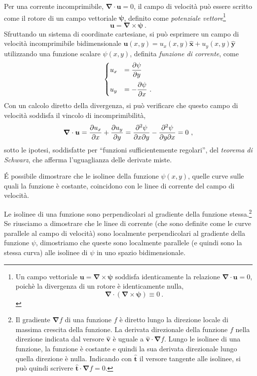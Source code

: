 
Per una corrente incomprimibile, $\bm{\nabla} \cdot \bm{u} = 0$, il campo di velocità può essere scritto come il rotore di un campo vettoriale $\bm{\psi}$, definito come \textit{potenziale vettore}\footnote{Un campo vettoriale $\bm{u} = \bm{\nabla} \times \bm{\psi}$ soddisfa identicamente la relazione $\bm{\nabla} \cdot \bm{u} = 0$, poichè la divergenza di un rotore è identicamente nulla,
\begin{equation}
  \bm{\nabla} \cdot \left( \bm{\nabla} \times \bm{\psi} \right) \equiv 0 \ .
\end{equation} }
\begin{equation}\label{eqn:psi}
 \bm{u} = \bm{\nabla} \times \bm{\psi} \ .
\end{equation}
Sfruttando un sistema di coordinate cartesiane, si può esprimere un campo di velocità incomprimibile bidimensionale $\bm{u}(x,y) = u_x(x,y) \bm{\hat{x}} + u_y(x,y) \bm{\hat{y}}$ utilizzando una funzione scalare $\psi(x,y)$, definita \textit{funzione di corrente}, come
\begin{equation}
\begin{cases}
 u_x & = \p{\psi}{y} \vspace{0.2cm} \\
 u_y & =-\p{\psi}{x} \ . \\
\end{cases}
\end{equation}
Con un calcolo diretto della divergenza, si può verificare che questo campo di velocità soddisfa il vincolo di incomprimibilità,
\begin{equation}
 \bm{\nabla} \cdot \bm{u} = \dfrac{\partial{u_x}}{\partial{x}} + \dfrac{\partial{u_y}}{\partial{y}} =
  \frac{\partial^2 \psi}{\partial x \partial y} - 
  \frac{\partial^2 \psi}{\partial y \partial x} = 0 \ ,
\end{equation}
sotto le ipotesi, soddisfatte per ``funzioni sufficientemente regolari'', del \textit{teorema di Schwarz}, che afferma l'uguaglianza delle derivate miste.

\vspace{0.2cm}
\'E possibile dimostrare che le isolinee della funzione $\psi(x,y)$, quelle curve sulle quali la funzione è costante, coincidono con le linee di corrente del campo di velocità.

\noindent
Le isolinee di una funzione sono perpendicolari al gradiente della funzione stessa.\footnote{
 Il gradiente $\bm{\nabla} f$ di una funzione $f$ è diretto lungo la direzione locale di massima crescita della funzione. La derivata direzionale della funzione $f$ nella direzione indicata dal versore $\bm{\hat{v}}$ è uguale a $\bm{\hat{v}} \cdot \bm{\nabla}f$. Lungo le isolinee di una funzione, la funzione è costante e quindi la sua derivata direzionale lungo quella direzione è nulla. Indicando con $\bm{\hat{t}}$ il versore tangente alle isolinee, si può quindi scrivere $\bm{\hat{t}} \cdot \bm{\nabla} f = 0$.
}
Se riusciamo a dimostrare che le linee di corrente (che sono definite come le curve parallele al campo di velocità) sono localmente perpendicolari al gradiente della funzione $\psi$, dimostriamo che queste sono localmente parallele (e quindi sono la stessa curva) alle isolinee di $\psi$ in uno spazio bidimensionale.

